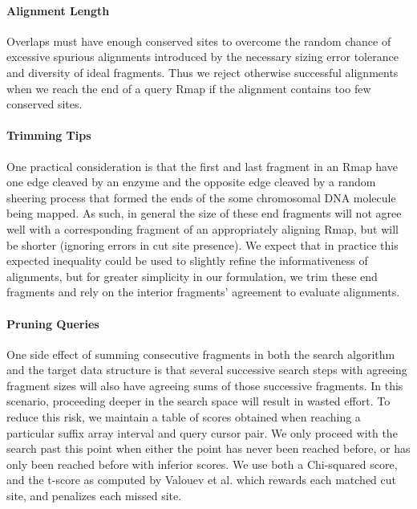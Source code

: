 \paragraph{Alignment Length}
Overlaps must have enough conserved sites to overcome the random chance of excessive spurious alignments introduced by the necessary sizing error tolerance and diversity of ideal fragments. Thus we reject otherwise successful alignments when we reach the end of a query Rmap if the alignment contains too few conserved sites.  

\paragraph{Trimming Tips}
One practical consideration is that the first and last fragment in an Rmap have one edge cleaved by an enzyme and the opposite edge cleaved by a random sheering process that formed the ends of the some chromosomal DNA molecule being mapped.  As such, in general the size of these end fragments will not agree well with a corresponding fragment of an appropriately aligning Rmap, but will be shorter (ignoring errors in cut site presence).  We expect that in practice this expected inequality could be used to slightly refine the informativeness of alignments, but for greater simplicity in our formulation, we trim these end fragments and rely on the interior fragments' agreement to evaluate alignments.

\paragraph{Pruning Queries}

One side effect of summing consecutive fragments in both the search algorithm and the target data structure is that several successive search steps with agreeing fragment sizes will also have agreeing sums of those successive fragments.  In this scenario, proceeding deeper in the search space will result in wasted effort. 
To reduce this risk, we maintain a table of scores obtained when reaching a particular suffix array interval and query cursor pair. We only proceed with the search past this point when either the point has never been reached before, or has only been reached before with inferior scores. We use both a Chi-squared score, and the t-score as computed by Valouev et al. which rewards each matched cut site, and penalizes each missed site.   

